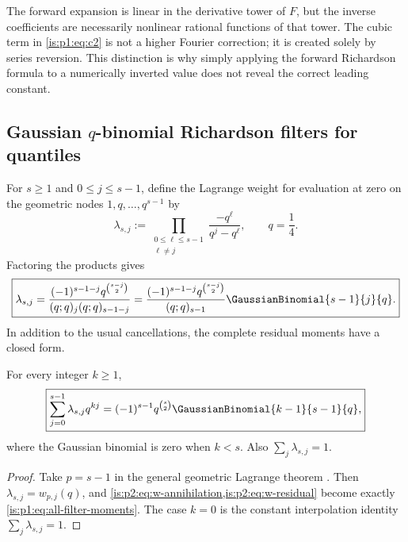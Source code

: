 \begin{remark}
The forward expansion is linear in the derivative tower of $F$, but the inverse
coefficients are necessarily nonlinear rational functions of that tower.  The cubic
term in \eqref{is:p1:eq:c2} is not a higher Fourier correction; it is created solely by
series reversion.  This distinction is why simply applying the forward Richardson
formula to a numerically inverted value does not reveal the correct leading constant.
\end{remark}

\subsection{Gaussian \texorpdfstring{$q$}{q}-binomial Richardson filters for quantiles}

For $s\ge1$ and $0\le j\le s-1$, define the Lagrange weight for evaluation at
zero on the geometric nodes $1,q,\ldots,q^{s-1}$ by
\begin{equation}
 \lambda_{s,j}:=
 \prod_{\substack{0\le\ell\le s-1\\\ell\ne j}}
 \frac{-q^\ell}{q^j-q^\ell},
 \qquad q=\frac14.
 \label{is:p1:eq:lambda-def}
\end{equation}
Factoring the products gives
\begin{equation}
 \boxed{
 \lambda_{s,j}=
 \frac{(-1)^{s-1-j}q^{\binom{s-j}{2}}}
 {(q;q)_j(q;q)_{s-1-j}}
 =\frac{(-1)^{s-1-j}q^{\binom{s-j}{2}}}{(q;q)_{s-1}}
 \GaussianBinomial{s-1}{j}{q}.}
 \label{is:p1:eq:lambda-qbinom}
\end{equation}
In addition to the usual cancellations, the complete residual moments have a closed
form.

\begin{corollary}
\label{is:p1:lem:filter-moments}
For every integer $k\ge1$,
\begin{equation}
 \boxed{
 \sum_{j=0}^{s-1}\lambda_{s,j}q^{kj}
 =(-1)^{s-1}q^{\binom s2}
 \GaussianBinomial{k-1}{s-1}{q},}
 \label{is:p1:eq:all-filter-moments}
\end{equation}
where the Gaussian binomial is zero when $k<s$.  Also
$\sum_j\lambda_{s,j}=1$.
\end{corollary}

\begin{proof}
Take $p=s-1$ in the general geometric Lagrange theorem
.  Then
$\lambda_{s,j}=w_{p,j}(q)$, and
\cref{is:p2:eq:w-annihilation,is:p2:eq:w-residual} become exactly
\eqref{is:p1:eq:all-filter-moments}.  The case $k=0$ is the constant
interpolation identity $\sum_j\lambda_{s,j}=1$.
\end{proof}

